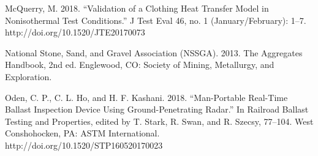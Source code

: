 \documentclass[a4paper]{eccomas_paper-2024}
\begin{document}
\begin{thebibliography}{99}
  McQuerry, M. 2018. “Validation of a Clothing Heat Transfer Model in Nonisothermal Test Conditions.” J Test Eval 46, no. 1 (January/February): 1–7. http://doi.org/10.1520/JTE20170073

   National Stone, Sand, and Gravel Association (NSSGA). 2013. The Aggregates Handbook, 2nd ed. Englewood, CO: Society of Mining, Metallurgy, and Exploration.

  Oden, C. P., C. L. Ho, and H. F. Kashani. 2018. “Man-Portable Real-Time Ballast Inspection Device Using Ground-Penetrating Radar.” In Railroad Ballast Testing and Properties, edited by T. Stark, R. Swan, and R. Szecsy, 77–104. West Conshohocken, PA: ASTM International. http://doi.org/10.1520/STP160520170023

\end{thebibliography}
\end{document}
